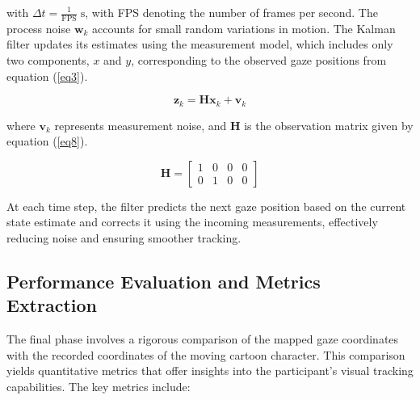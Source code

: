 \documentclass[10pt,a4paper,twoside]{article}
\begin{document}
with \( \Delta t = \frac{1}{\text{FPS}} \;\text{s} \), with FPS denoting the number of frames per second. The process noise \( \mathbf{w}_k \) accounts for small random variations in motion. The Kalman filter updates its estimates using the measurement model, which includes only two components, \( x \) and \( y \), corresponding to the observed gaze positions from equation (\ref{eq3}).

\begin{equation}
\label{eq7}
\mathbf{z}_k = \mathbf{H} \mathbf{x}_k + \mathbf{v}_k
\end{equation}

where \( \mathbf{v}_k \) represents measurement noise, and \( \mathbf{H} \) is the observation matrix given by equation (\ref{eq8}).

\begin{equation}
\label{eq8}
\mathbf{H} =
\begin{bmatrix}
1 & 0 & 0 & 0 \\
0 & 1 & 0 & 0
\end{bmatrix}
\end{equation}

At each time step, the filter predicts the next gaze position based on the current state estimate and corrects it using the incoming measurements, effectively reducing noise and ensuring smoother tracking.

\subsection{Performance Evaluation and Metrics Extraction}
\label{perf}

The final phase involves a rigorous comparison of the mapped gaze coordinates with the recorded coordinates of the moving cartoon character. This comparison yields quantitative metrics that offer insights into the participant’s visual tracking capabilities. The key metrics include:
\end{document}
